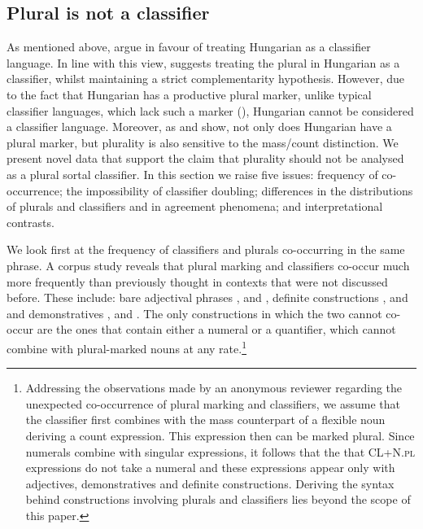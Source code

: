 \documentclass[output=paper]{langscibook}
\begin{document}
\subsection{Plural is not a classifier} \label{schv-nem:sec:3.1}

As mentioned above, \citet{csirmaz-dekany-14} argue in favour of treating Hungarian as a classifier language. In line with this view, \citet{dekany-11} suggests treating the plural in Hungarian as a classifier, whilst maintaining a strict complementarity hypothesis.  However, due to the fact that Hungarian has a productive plural marker, unlike typical classifier languages, which lack such a marker
(\citealt{chierchia-98a,Chierchia-2010,cheng-sybesma-99}), Hungarian cannot be considered a classifier language. Moreover, as \citet{schvarcz-14} and \citet{schvarcz-rothstein-17} show, not only does Hungarian have a plural marker, but plurality is also sensitive to the mass/count distinction. We present novel data that support the claim that plurality should not be analysed as a plural sortal classifier.  In this section we raise five issues: frequency of co-occurrence; the impossibility of classifier doubling; differences in the distributions of plurals and classifiers and in agreement phenomena; and interpretational contrasts.

We look first at the frequency of classifiers and plurals co-occurring in the same phrase. A corpus study reveals that plural marking and classifiers co-occur much more frequently than previously thought in contexts that were not discussed before. These include: bare adjectival phrases ,  and , definite constructions ,  and  and demonstratives ,  and . The only constructions in which the two cannot co-occur are the ones that contain either a numeral or a quantifier, which cannot combine with plural-marked nouns at any rate.\footnote{Addressing the observations made by an anonymous reviewer regarding the unexpected co-occurrence of plural marking and classifiers, we assume that the classifier first combines with the mass counterpart of a flexible noun deriving a count expression. This expression then can be marked plural. Since numerals combine with singular expressions, it follows that the  that CL+N.\textsc{pl} expressions do not take a numeral and these expressions appear only with adjectives, demonstratives and definite constructions. Deriving the syntax behind constructions involving plurals and classifiers lies beyond the scope of this paper.}
\end{document}
